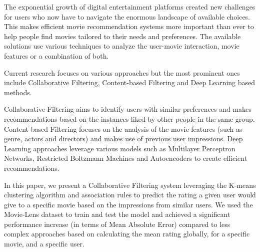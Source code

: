 The exponential growth of digital entertainment platforms created new challenges for users who now have to navigate the enormous landscape of available choices. This makes efficient movie recommendation systems more important than ever to help people find movies tailored to their needs and preferences. The available solutions use various techniques to analyze the user-movie interaction, movie features or a combination of both.

Current research focuses on various approaches but the most prominent ones include Collaborative Filtering, Content-based Filtering and Deep Learning based methods.

Collaborative Filtering aims to identify users with similar preferences and makes recommendations based on the instances liked by other people in the same group. Content-based Filtering focuses on the analysis of the movie features (such as genre, actors and directors) and makes use of previous user impressions. Deep Learning approaches leverage various models such as Multilayer Perceptron Networks, Restricted Boltzmann Machines and Autoencoders to create efficient recommendations.

In this paper, we present a Collaborative Filtering system leveraging the K-means clustering algorithm and association rules to predict the rating a given user would give to a specific movie based on the impressions from similar users. We used the Movie-Lens dataset to train and test the model and achieved a significant performance increase (in terms of Mean Absolute Error) compared to less complex approaches based on calculating the mean rating globally, for a specific movie, and a specific user.